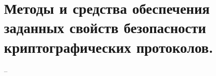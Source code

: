 \section{Методы и средства обеспечения заданных свойств безопасности криптографических протоколов.}

--